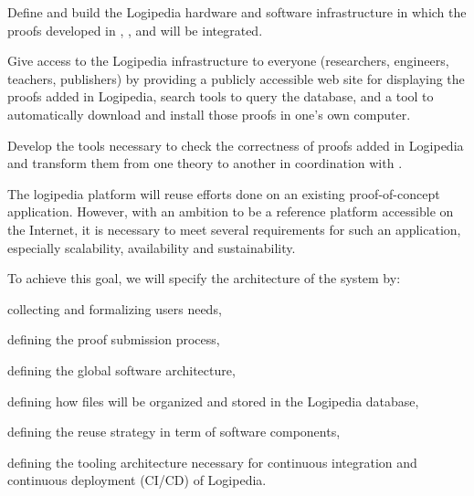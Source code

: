 \begin{workpackage}[id=access,type=RTD,wphases=1-48,
  short=Access,%
  title={Access},
  lead=Inr,InrRM=54,OcaRM=6]

\begin{wpobjectives}
  \begin{compactitem}
  \item Define and build the Logipedia hardware and software
    infrastructure in which the proofs developed in
    , ,  and
     will be integrated.
  \item Give access to the Logipedia infrastructure to everyone
    (researchers, engineers, teachers, publishers) by providing a
    publicly accessible web site for displaying the proofs added in
    Logipedia, search tools to query the database, and a tool to
    automatically download and install those proofs in one's own
    computer.
  \item Develop the tools necessary to check the correctness of proofs
    added in Logipedia and transform them from one theory to another
    in coordination with .
  \end{compactitem}
\end{wpobjectives}

\begin{tasklist}

  \begin{task}[id=archi,
      title=Setting up the hardware and software architecture,
      shorttitle=Archi.,
      lead=Inr,InrRM=6,wphases=1-6]
    The logipedia platform will reuse efforts done on an existing
    proof-of-concept application. However, with an ambition to be a
    reference platform accessible on the Internet, it is necessary to meet
    several requirements for such an application, especially
    scalability, availability and sustainability.

    To achieve this goal, we will specify the architecture of the system by:
    \begin{compactitem}
    \item collecting and formalizing users needs,
    \item defining the proof submission process,
    \item defining the global software architecture,
    \item defining how files will be organized and stored in the
      Logipedia database,
    \item defining the reuse strategy in term of software components,
    \item defining the tooling architecture necessary for continuous
      integration and continuous deployment (CI/CD) of Logipedia.
    \end{compactitem}


\end{task}
\end{tasklist}
\end{workpackage}
